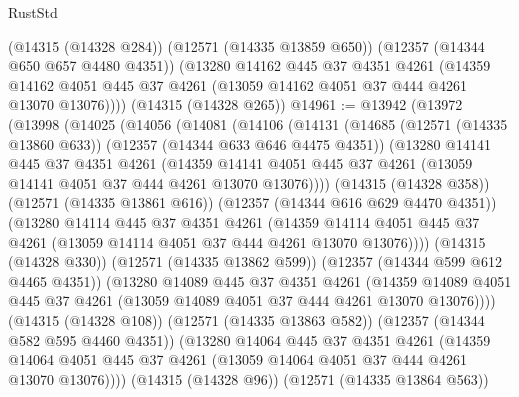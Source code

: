 \begin{lexlean}{RustStd}
\begin{coremodule}
      (@14315 (@14328 @284))
      (@12571 (@14335 @13859 @650))
      (@12357 (@14344 @650 @657 @4480 @4351))
      (@13280
        @14162
        @445
        @37
        @4351
        @4261
        (@14359 @14162 @4051 @445 @37 @4261 (@13059 @14162 @4051 @37 @444 @4261 @13070 @13076))))
    (@14315 (@14328 @265))
@14961 := @13942
    (@13972
      (@13998
        (@14025
          (@14056
            (@14081
              (@14106
                (@14131
                  (@14685
                    (@12571 (@14335 @13860 @633))
                    (@12357 (@14344 @633 @646 @4475 @4351))
                    (@13280
                      @14141
                      @445
                      @37
                      @4351
                      @4261
                      (@14359
                        @14141
                        @4051
                        @445
                        @37
                        @4261
                        (@13059 @14141 @4051 @37 @444 @4261 @13070 @13076))))
                  (@14315 (@14328 @358))
                  (@12571 (@14335 @13861 @616))
                  (@12357 (@14344 @616 @629 @4470 @4351))
                  (@13280
                    @14114
                    @445
                    @37
                    @4351
                    @4261
                    (@14359
                      @14114
                      @4051
                      @445
                      @37
                      @4261
                      (@13059 @14114 @4051 @37 @444 @4261 @13070 @13076))))
                (@14315 (@14328 @330))
                (@12571 (@14335 @13862 @599))
                (@12357 (@14344 @599 @612 @4465 @4351))
                (@13280
                  @14089
                  @445
                  @37
                  @4351
                  @4261
                  (@14359
                    @14089
                    @4051
                    @445
                    @37
                    @4261
                    (@13059 @14089 @4051 @37 @444 @4261 @13070 @13076))))
              (@14315 (@14328 @108))
              (@12571 (@14335 @13863 @582))
              (@12357 (@14344 @582 @595 @4460 @4351))
              (@13280
                @14064
                @445
                @37
                @4351
                @4261
                (@14359
                  @14064
                  @4051
                  @445
                  @37
                  @4261
                  (@13059 @14064 @4051 @37 @444 @4261 @13070 @13076))))
            (@14315 (@14328 @96))
            (@12571 (@14335 @13864 @563))

\end{coremodule}
\end{lexlean}
